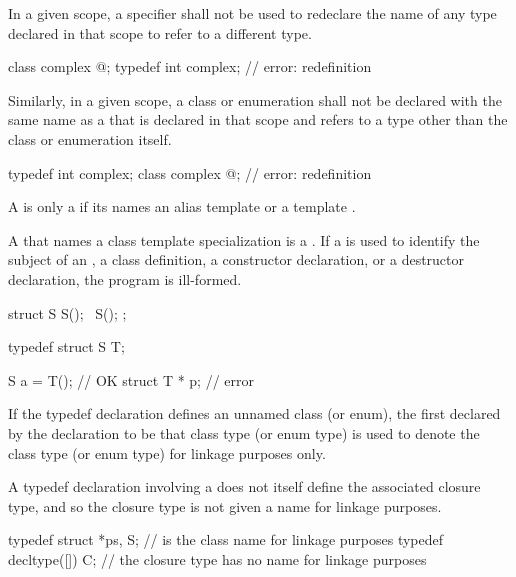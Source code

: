 \pnum
In a given scope, a  specifier shall not be used to
redeclare the name of any type declared in that scope to refer to a
different type.
\begin{example}
\begin{codeblock}
class complex { @\commentellip@ };
typedef int complex;            // error: redefinition
\end{codeblock}
\end{example}

\pnum
Similarly, in a given scope, a class or enumeration shall not be
declared with the same name as a  that is
declared in that scope and refers to a type other than the class or
enumeration itself.
\begin{example}
\begin{codeblock}
typedef int complex;
class complex { @\commentellip@ };    // error: redefinition
\end{codeblock}
\end{example}

\pnum
{}%
A  is only a 
if its  names
an alias template or a template .
\begin{note}
A  that names a class template specialization
is a .
If a  is used to identify the subject of an
, a class
definition, a constructor
declaration, or a destructor
declaration, the program is ill-formed.
\end{note}
\begin{example}
\begin{codeblock}
struct S {
  S();
  ~S();
};

typedef struct S T;

S a = T();                      // OK
struct T * p;                   // error
\end{codeblock}
\end{example}

\pnum
{}%
%
%
If the typedef declaration defines an unnamed class (or enum), the first
 declared by the declaration to be that class
type (or enum type) is used to denote the class type (or enum type) for
linkage purposes only.
\begin{note}
A typedef declaration involving a 
does not itself define the associated closure type,
and so the closure type is not given a name for linkage purposes.
\end{note}
\begin{example}
\begin{codeblock}
typedef struct { } *ps, S;      //  is the class name for linkage purposes
typedef decltype([]{}) C;       // the closure type has no name for linkage purposes
\end{codeblock}
\end{example}

